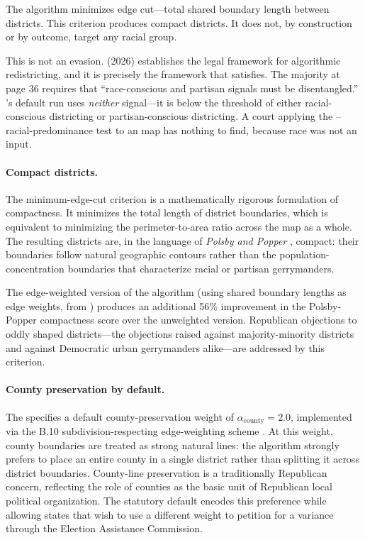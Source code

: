 The algorithm minimizes edge cut---total shared boundary length between
districts.
This criterion produces compact districts.
It does not, by construction or by outcome, target any racial group.

This is not an evasion.
\callais{} (2026) establishes the legal framework for algorithmic
redistricting, and it is precisely the framework that \ar{} satisfies.
The majority at page 36 requires that ``race-conscious and partisan signals
must be disentangled.''
\ar{}'s default run uses \emph{neither} signal---it is below the threshold
of either racial-conscious districting or partisan-conscious districting.
A court applying the \shaw{}--\miller{} racial-predominance test to an
\ar{} map has nothing to find, because race was not an input.

\paragraph{Compact districts.}
The minimum-edge-cut criterion is a mathematically rigorous formulation of
compactness.
It minimizes the total length of district boundaries, which is equivalent
to minimizing the perimeter-to-area ratio across the map as a whole.
The resulting districts are, in the language of \textit{Polsby and Popper}
\citep{polsby1991}, compact: their boundaries follow natural geographic
contours rather than the population-concentration boundaries that
characterize racial or partisan gerrymanders.

The edge-weighted version of the algorithm (using shared boundary lengths
as edge weights, from \citet{b2paper}) produces an additional 56\%
improvement in the Polsby-Popper compactness score over the unweighted
version.
Republican objections to oddly shaped districts---the objections raised
against majority-minority districts and against Democratic urban gerrymanders
alike---are addressed by this criterion.

\paragraph{County preservation by default.}
The \dia{} specifies a default county-preservation weight of $\alpha_\text{county} = 2.0$,
implemented via the B.10 subdivision-respecting edge-weighting scheme
\citep{b10paper}.
At this weight, county boundaries are treated as strong natural lines:
the algorithm strongly prefers to place an entire county in a single
district rather than splitting it across district boundaries.
County-line preservation is a traditionally Republican concern, reflecting
the role of counties as the basic unit of Republican local political
organization.
The statutory default encodes this preference while allowing states that
wish to use a different weight to petition for a variance through the
Election Assistance Commission.

